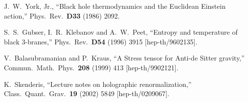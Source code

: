 \begin{thebibliography}{99}

%
%

  J.~W.~York, Jr.,
  ``Black hole thermodynamics and the Euclidean Einstein action,''
  Phys.\ Rev.\  {\bf D33 } (1986)  2092.
  
  S.~S.~Gubser, I.~R.~Klebanov and A.~W.~Peet,
  ``Entropy and temperature of black 3-branes,''
  Phys.\ Rev.\  {\bf D54 } (1996)  3915
  [hep-th/9602135]. 
 
  V.~Balasubramanian and P.~Kraus,
  ``A Stress tensor for Anti-de Sitter gravity,''
  Commun.\ Math.\ Phys.\  {\bf 208 } (1999)  413 
  [hep-th/9902121].
  
  K.~Skenderis,
  ``Lecture notes on holographic renormalization,''
  Class.\ Quant.\ Grav.\  {\bf 19} (2002) 5849
  [hep-th/0209067].

\end{thebibliography}